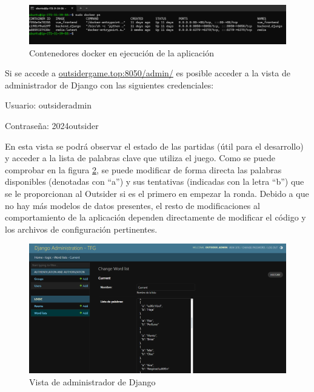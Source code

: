 \begin{figure}[h]
	\centering
	\includegraphics[width=\textwidth,clip=true]{res_amazon.png}
	\caption{Contenedores docker en ejecución de la aplicación}
	\label{fig:res_amazon}
\end{figure}

Si se accede a \href{http://outsidergame.top:8050/admin/}{outsidergame.top:8050/admin/} es posible 
acceder a la vista de administrador de Django con las siguientes credenciales:

\begin{compactitem}
	\item Usuario: outsider\textunderscore admin
	\item Contraseña: 2024outsider
\end{compactitem}

En esta vista se podrá observar el estado de las partidas (útil para el desarrollo) y acceder a la lista
de palabras clave que utiliza el juego. Como se puede comprobar en la figura \ref{fig:res_admin}, se puede modificar de forma
directa las palabras disponibles (denotadas con ``a'') y sus tentativas (indicadas con la letra ``b'') 
que se le proporcionan al Outsider si es el primero en empezar la ronda. Debido a que no hay más modelos de 
datos presentes, el resto de modificaciones al comportamiento de la aplicación dependen 
directamente de modificar el código y los archivos de configuración pertinentes.

\begin{figure}[h]
	\centering
	\includegraphics[width=\textwidth,clip=true]{res_admin.png}
	\caption{Vista de administrador de Django}
	\label{fig:res_admin}
\end{figure}


